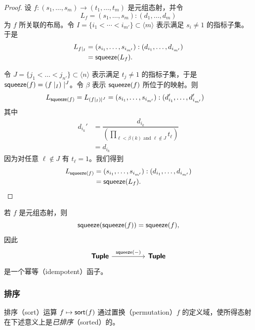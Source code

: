 \begin{proof}
    设 $f:(s_1,\dots,s_m) \to (t_1,\dots,t_m)$ 是元组态射，并令
    \[
    L_f = (s_1,\dots,s_m):(d_1,\dots,d_m)
    \]
    为 $f$ 所关联的布局。令 $I = \{i_1<\cdots < i_{m'}\} \subset \langle m \rangle$ 表示满足 $s_i \neq 1$ 的指标子集。于是
    \begin{align*}
    L_{f \mid_I} & = (s_{i_1},\dots,s_{i_{m'}}):(d_{i_1},\dots,d_{i_{m'}})\\
    & = \mathsf{squeeze}(L_f).
    \end{align*}

    \noindent 令 $J = \{j_1<\dots<j_{n'}\} \subset \langle n \rangle$ 表示满足 $t_j \neq 1$ 的指标子集，于是 $\mathsf{squeeze}(f) = \left(f \mid_I \right)\mid^J$。令 $\beta$ 表示 $\mathsf{squeeze}(f)$ 所位于的映射。则
    \begin{align*}
        L_{\mathsf{squeeze}(f)} = L_{\left( f \mid_I \right)\mid^J} & = (s_{i_1},\dots,s_{i_{m'}}) : (d_{i_1}',\dots,d_{i_{m'}}')
    \end{align*}
    其中
    \begin{align*}
    d_{i_k}' & = \dfrac{d_{i_k}}{\left( \displaystyle\prod_{\ell < \beta(k) \text{ and }\ell \notin J } t_{\ell} \right)}\\
    & = d_{i_k}
    \end{align*}
    因为对任意 $\ell \notin J$ 有 $t_\ell = 1$。我们得到
    \begin{align*}
    L_{\mathsf{squeeze}(f)} & = (s_{i_1},\dots,s_{i_{m'}}):(d_{i_1},\dots,d_{i_{m'}})\\
    & = \mathsf{squeeze}(L_f).
    \end{align*}
\end{proof}

\begin{observation}
    若 $f$ 是元组态射，则
    \[
    \mathsf{squeeze}(\mathsf{squeeze}(f)) = \mathsf{squeeze}(f),
    \]
    因此
    \[
    \begin{tikzcd}
    \catstyle{Tuple} \ar[rr,"\squeeze(-)"] & & \catstyle{Tuple}
    \end{tikzcd} \]
    是一个幂等（idempotent）函子。
\end{observation}



\subsubsection{排序}
\label{subsubsection.sort}

排序（sort）运算 $f \mapsto \mathsf{sort}(f)$ 通过置换（permutation）$f$ 的定义域，使所得态射在下述意义上是{\it 已排序}（sorted）的。


